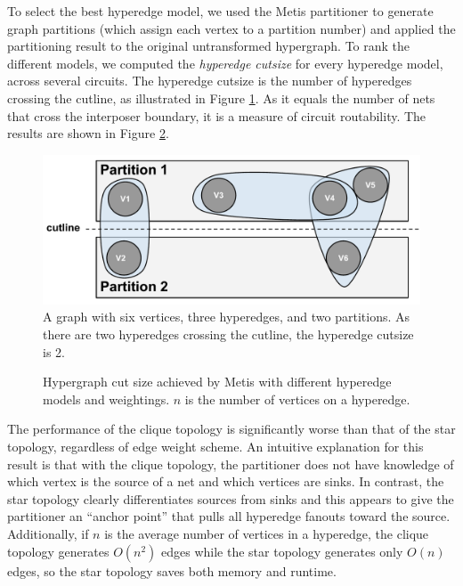 To select the best hyperedge model, we used the Metis partitioner to generate graph partitions (which assign each vertex to a partition number) and applied the partitioning result to the original untransformed hypergraph. To rank the different models, we computed the \emph{hyperedge cutsize} for every hyperedge model, across several circuits. The hyperedge cutsize is the number of hyperedges crossing the cutline, as illustrated in Figure \ref{fig:hyperedge_cutline}. As it equals the number of nets that cross the interposer boundary, it is a measure of circuit routability. The results are shown in Figure \ref{fig:graph_topology_cutsize}.

\begin{figure}[!htbp]
\centering
\includegraphics[width=\linewidth]{hyperedge_cutline.pdf}
\caption{A graph with six vertices, three hyperedges, and two partitions. As there are two hyperedges crossing the cutline, the hyperedge cutsize is 2.}
\label{fig:hyperedge_cutline}
\end{figure}

\begin{figure}[!htbp]
\centering
%

\caption{Hypergraph cut size achieved by Metis with different hyperedge models and weightings. $n$ is the number of vertices on a hyperedge.}
\label{fig:graph_topology_cutsize}
\end{figure}

The performance of the clique topology is significantly worse than that of the star topology, regardless of edge weight scheme. An intuitive explanation for this result is that with the clique topology, the partitioner does not have knowledge of which vertex is the source of a net and which vertices are sinks. In contrast, the star topology clearly differentiates sources from sinks and this appears to give the partitioner an “anchor point” that pulls all hyperedge fanouts toward the source. Additionally, if $n$ is the average number of vertices in a hyperedge, the clique topology generates $O(n^2)$ edges while the star topology generates only $O(n)$ edges, so the star topology saves both memory and runtime.

